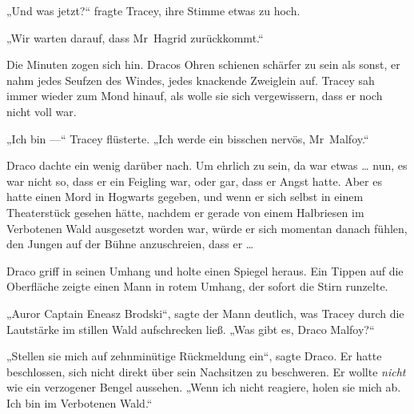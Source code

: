 „Und was jetzt?“ fragte Tracey, ihre Stimme etwas zu hoch.

„Wir warten darauf, dass Mr~Hagrid zurückkommt.“

Die Minuten zogen sich hin. Dracos Ohren schienen schärfer zu sein als sonst, er nahm jedes Seufzen des Windes, jedes knackende Zweiglein auf. Tracey sah immer wieder zum Mond hinauf, als wolle sie sich vergewissern, dass er noch nicht voll war.

„Ich bin —“ Tracey flüsterte.
„Ich werde ein bisschen nervös, Mr~Malfoy.“

Draco dachte ein wenig darüber nach. Um ehrlich zu sein, da war etwas … nun, es war nicht so, dass er ein Feigling war, oder gar, dass er Angst hatte. Aber es hatte einen Mord in Hogwarts gegeben, und wenn er sich selbst in einem Theaterstück gesehen hätte, nachdem er gerade von einem Halbriesen im Verbotenen Wald ausgesetzt worden war, würde er sich momentan danach fühlen, den Jungen auf der Bühne anzuschreien, dass er …

Draco griff in seinen Umhang und holte einen Spiegel heraus. Ein Tippen auf die Oberfläche zeigte einen Mann in rotem Umhang, der sofort die Stirn runzelte.

„Auror Captain Eneasz Brodski“, sagte der Mann deutlich, was Tracey durch die Lautstärke im stillen Wald aufschrecken ließ.
„Was gibt es, Draco Malfoy?“

„Stellen sie mich auf zehnminütige Rückmeldung ein“, sagte Draco. Er hatte beschlossen, sich nicht direkt über sein Nachsitzen zu beschweren. Er wollte \emph{nicht} wie ein verzogener Bengel aussehen.
„Wenn ich nicht reagiere, holen sie mich ab. Ich bin im Verbotenen Wald.“

